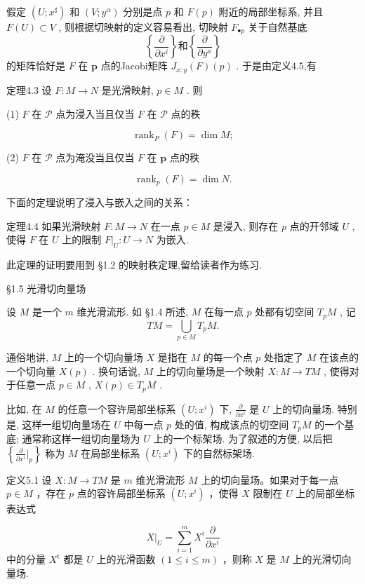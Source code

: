 假定  $(U; x^{\sharp})$  和  $(V; y^{\alpha})$  分别是点  $p$  和  $F(p)$  附近的局部坐标系, 并且  $F(U) \subset V$ , 则根据切映射的定义容易看出, 切映射  $F_{\bullet p}$  关于自然基底
$$
\left\{\frac {\partial}{\partial x ^ {i}} \right\} \text {和} \left\{\frac {\partial}{\partial y ^ {a}} \right\}
$$
的矩阵恰好是  $F$  在  $\pmb{p}$  点的Jacobi矩阵  $J_{x:y}(F)(p)$ . 于是由定义4.5,有

定理4.3 设  $F: M \to N$  是光滑映射,  $p \in M$ . 则

(1)  $F$  在  $\mathcal{P}$  点为浸入当且仅当  $F$  在  $\mathcal{P}$  点的秩

$$
\operatorname {r a n k} _ {P} (F) = \dim M;
$$

(2)  $F$  在  $\mathcal{P}$  点为淹没当且仅当  $F$  在  $\pmb{p}$  点的秩

$$
\operatorname {r a n k} _ {p} (F) = \dim N.
$$

下面的定理说明了浸入与嵌入之间的关系：

定理4.4 如果光滑映射  $F: M \to N$  在一点  $p \in M$  是浸入, 则存在  $p$  点的开邻域  $U$ , 使得  $F$  在  $U$  上的限制  $F|_{U}: U \to N$  为嵌入.

此定理的证明要用到 §1.2 的映射秩定理,留给读者作为练习.

 §1.5 光滑切向量场

设  $M$  是一个  $m$  维光滑流形. 如 §1.4 所述,  $M$  在每一点  $p$  处都有切空间  $T_{p}M$ , 记
$$
T M = \bigcup_ {p \in M} T _ {p} M.
$$

通俗地讲,  $M$  上的一个切向量场  $X$  是指在  $M$  的每一个点  $p$  处指定了  $M$  在该点的一个切向量  $X(p)$ . 换句话说,  $M$  上的切向量场是一个映射  $X: M \to TM$ , 使得对于任意一点  $p \in M$ ,  $X(p) \in T_pM$ .

比如, 在  $M$  的任意一个容许局部坐标系  $(U; x^i)$  下,  $\frac{\partial}{\partial x^i}$  是  $U$  上的切向量场. 特别是, 这样一组切向量场在  $U$  中每一点  $p$  处的值, 构成该点的切空间  $T_p M$  的一个基底; 通常称这样一组切向量场为  $U$  上的一个标架场. 为了叙述的方便, 以后把  $\left\{\frac{\partial}{\partial x^i}\bigg|_p\right\}$  称为  $M$  在局部坐标系  $(U; x^i)$  下的自然标架场.

定义5.1 设  $X: M \to TM$  是  $m$  维光滑流形  $M$  上的切向量场。如果对于每一点  $p \in M$ ，存在  $p$  点的容许局部坐标系  $(U; x^i)$ ，使得  $X$  限制在  $U$  上的局部坐标表达式

$$
X | _ {U} = \sum_ {i = 1} ^ {m} X ^ {i} \frac {\partial}{\partial x ^ {i}}
$$
中的分量  $X^{\mathrm{t}}$  都是  $U$  上的光滑函数  $(1\leqslant i\leqslant m)$  ，则称  $X$  是  $M$  上的光滑切向量场.

